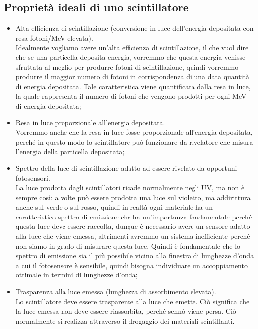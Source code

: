 \subsection{Proprietà ideali di uno scintillatore}
\begin{itemize}[leftmargin=0.5cm]
   \item Alta efficienza di scintillazione (conversione in luce dell'energia depositata con resa fotoni/MeV elevata).\\
   Idealmente vogliamo avere un'alta efficienza di scintillazione, il che vuol dire che se una particella deposita energia, vorremmo che questa energia venisse sfruttata al meglio per produrre fotoni di scintillazione, quindi vorremmo produrre il maggior numero di fotoni in corrispondenza di una data quantità di energia depositata. Tale caratteristica viene quantificata dalla resa in luce, la quale rappresenta il numero di fotoni che vengono prodotti per ogni MeV di energia depositata;
   \item Resa in luce proporzionale all'energia depositata.\\
   Vorremmo anche che la resa in luce fosse proporzionale all'energia depositata, perché in questo modo lo scintillatore può funzionare da rivelatore che misura l'energia della particella depositata;
   \item Spettro della luce di scintillazione adatto ad essere rivelato da opportuni fotosensori.\\
   La luce prodotta dagli scintillatori ricade normalmente negli UV, ma non è sempre così: a volte può essere prodotta una luce sul violetto, ma addirittura anche sul verde o sul rosso, quindi in realtà ogni materiale ha un caratteristico spettro di emissione che ha un'importanza fondamentale perché questa luce deve essere raccolta, dunque è necessario avere un sensore adatto alla luce che viene emessa, altrimenti avremmo un sistema inefficiente perché non siamo in grado di misurare questa luce. Quindi è fondamentale che lo spettro di emissione sia il più possibile vicino alla finestra di lunghezze d'onda a cui il fotosensore è sensibile, quindi bisogna individuare un accoppiamento ottimale in termini di lunghezze d'onda;
   \item Trasparenza alla luce emessa (lunghezza di assorbimento elevata).\\
   Lo scintillatore deve essere trasparente alla luce che emette. Ciò significa che la luce emessa non deve essere riassorbita, perché sennò viene persa. Ciò normalmente si realizza attraverso il drogaggio dei materiali scintillanti.\\

\end{itemize}
